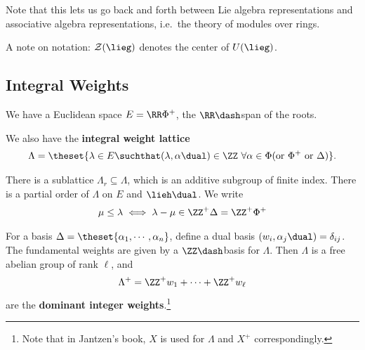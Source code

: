 \begin{remark}

Note that this lets us go back and forth between Lie algebra
representations and associative algebra representations, i.e.~the theory
of modules over rings.

\end{remark}

\begin{remark}

A note on notation: \(\mathcal Z(\lieg)\) denotes the center of
\(U(\lieg)\).

\end{remark}

\hypertarget{integral-weights}{%
\subsection{Integral Weights}\label{integral-weights}}

We have a Euclidean space \(E = \RR \Phi^+\), the \(\RR\dash\)span of
the roots.

\begin{definition}

We also have the \textbf{integral weight lattice}
\begin{align*}
\Lambda = \theset{\lambda \in E \suchthat (\lambda, \alpha\dual) \in \ZZ ~\forall \alpha\in\Phi (\text{or}~ \Phi^+ ~\text{or}~ \Delta)}
.\end{align*}

\end{definition}

\begin{definition}

There is a sublattice \(\Lambda_r \subseteq \Lambda\), which is an
additive subgroup of finite index. There is a partial order of
\(\Lambda\) on \(E\) and \(\lieh\dual\). We write
\begin{align*}
\mu \leq \lambda \iff \lambda - \mu \in \ZZ^+ \Delta = \ZZ^+ \Phi^+
\end{align*}

\end{definition}

\begin{definition}

For a basis \(\Delta = \theset{\alpha_1, \cdots, \alpha_n}\), define a
dual basis \((w_i ,\alpha_j\dual) = \delta_{ij}\). The fundamental
weights are given by a \(\ZZ\dash\)basis for \(\Lambda\). Then
\(\Lambda\) is a free abelian group of rank \(\ell\), and
\begin{align*}
\Lambda^+ = \ZZ^+ w_1 + \cdots + \ZZ^+ w_\ell
\end{align*} are the \textbf{dominant integer weights}.\footnote{Note
  that in Jantzen's book, \(X\) is used for \(\Lambda\) and \(X^+\)
  correspondingly.}

\end{definition}

